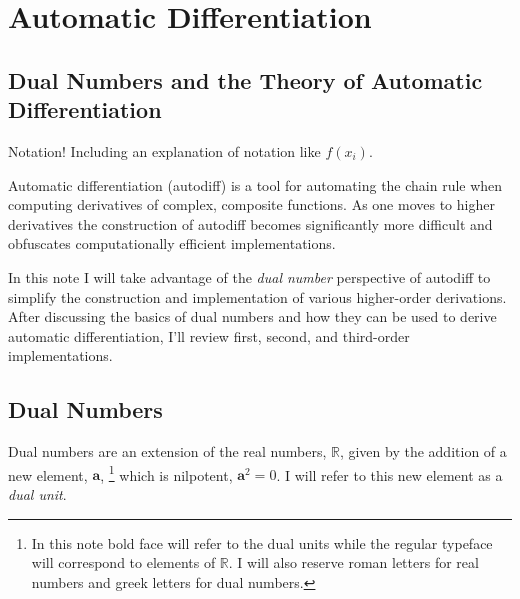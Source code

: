 \chapter{Automatic Differentiation}

\section{Dual Numbers and the Theory of Automatic Differentiation}

Notation!  Including an explanation of notation like $f \! \left( x_{i} \right)$.

Automatic differentiation (autodiff) is a tool for automating the chain rule when 
computing derivatives of complex, composite functions.  As one moves to higher 
derivatives the construction of autodiff becomes significantly more difficult and 
obfuscates computationally efficient implementations.

In this note I will take advantage of the \textit{dual number} perspective of autodiff
to simplify the construction and implementation of various higher-order derivations.
After discussing the basics of dual numbers and how they can be used to derive
automatic differentiation, I'll review first, second, and third-order implementations.

\section*{Dual Numbers}

Dual numbers are an extension of the real numbers, $\mathbb{R}$, given by the
addition of a new element, $\mathbf{a}$,%
%
\footnote{In this note bold face will refer to the dual units while the regular
typeface will correspond to elements of $\mathbb{R}$.  I will also reserve
roman letters for real numbers and greek letters for dual numbers.}
%
which is nilpotent, $\mathbf{a}^{2} = 0$. I will refer to this new element as a \textit{dual unit}.


